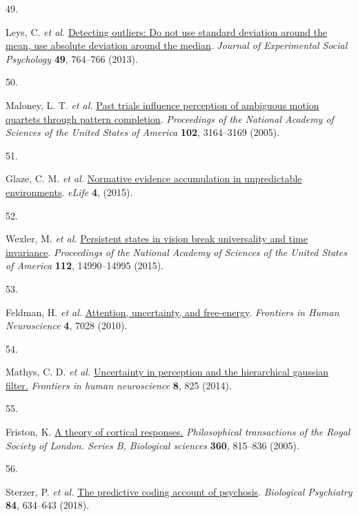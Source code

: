 \documentclass[
]{article}
\newlength{\cslhangindent}
\newlength{\csllabelwidth}
\newlength{\cslentryspacingunit} %
\newenvironment{CSLReferences}[2] %
 {%
  \setlength{\parindent}{0pt}
  \ifodd #1
  \let\oldpar\par
  \def\par{\hangindent=\cslhangindent\oldpar}
  \fi
  \setlength{\parskip}{#2\cslentryspacingunit}
 }%
 {}
\newcommand{\CSLLeftMargin}[1]{\parbox[t]{\csllabelwidth}{#1}}
\newcommand{\CSLRightInline}[1]{\parbox[t]{\linewidth - \csllabelwidth}{#1}\break}
\begin{document}
\begin{CSLReferences}{0}{0}
\leavevmode{}%
\CSLLeftMargin{49. }%
\CSLRightInline{Leys, C. \emph{et al.}
\href{https://doi.org/10.1016/J.JESP.2013.03.013}{Detecting outliers: Do
not use standard deviation around the mean, use absolute deviation
around the median}. \emph{Journal of Experimental Social Psychology}
\textbf{49}, 764--766 (2013).}

\leavevmode{}%
\CSLLeftMargin{50. }%
\CSLRightInline{Maloney, L. T. \emph{et al.}
\href{https://doi.org/10.1073/pnas.0407157102}{Past trials influence
perception of ambiguous motion quartets through pattern completion}.
\emph{Proceedings of the National Academy of Sciences of the United
States of America} \textbf{102}, 3164--3169 (2005).}

\leavevmode{}%
\CSLLeftMargin{51. }%
\CSLRightInline{Glaze, C. M. \emph{et al.}
\href{https://doi.org/10.7554/eLife.08825}{Normative evidence
accumulation in unpredictable environments}. \emph{eLife} \textbf{4},
(2015).}

\leavevmode{}%
\CSLLeftMargin{52. }%
\CSLRightInline{Wexler, M. \emph{et al.}
\href{https://doi.org/10.1073/pnas.1508847112}{Persistent states in
vision break universality and time invariance}. \emph{Proceedings of the
National Academy of Sciences of the United States of America}
\textbf{112}, 14990--14995 (2015).}

\leavevmode{}%
\CSLLeftMargin{53. }%
\CSLRightInline{Feldman, H. \emph{et al.}
\href{https://doi.org/10.3389/FNHUM.2010.00215/BIBTEX}{Attention,
uncertainty, and free-energy}. \emph{Frontiers in Human Neuroscience}
\textbf{4}, 7028 (2010).}

\leavevmode{}%
\CSLLeftMargin{54. }%
\CSLRightInline{Mathys, C. D. \emph{et al.}
\href{https://doi.org/10.3389/fnhum.2014.00825}{Uncertainty in
perception and the hierarchical gaussian filter.} \emph{Frontiers in
human neuroscience} \textbf{8}, 825 (2014).}

\leavevmode{}%
\CSLLeftMargin{55. }%
\CSLRightInline{Friston, K.
\href{https://doi.org/10.1098/rstb.2005.1622}{A theory of cortical
responses.} \emph{Philosophical transactions of the Royal Society of
London. Series B, Biological sciences} \textbf{360}, 815--836 (2005).}

\leavevmode{}%
\CSLLeftMargin{56. }%
\CSLRightInline{Sterzer, P. \emph{et al.}
\href{https://doi.org/10.1016/j.biopsych.2018.05.015}{The predictive
coding account of psychosis}. \emph{Biological Psychiatry} \textbf{84},
634--643 (2018).}


\end{CSLReferences}
\end{document}
